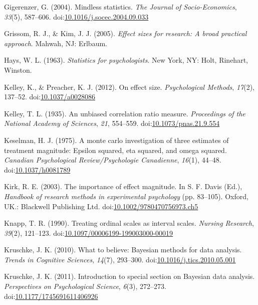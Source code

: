 \documentclass[english,man]{apa6}
\theoremstyle{definition}
\theoremstyle{definition}
\theoremstyle{definition}
\theoremstyle{remark}
\begin{document}
\hypertarget{ref-Gigerenzer2004}{}
Gigerenzer, G. (2004). Mindless statistics. \emph{The Journal of
Socio-Economics}, \emph{33}(5), 587--606.
doi:\href{https://doi.org/10.1016/j.socec.2004.09.033}{10.1016/j.socec.2004.09.033}

\hypertarget{ref-Grissom2005}{}
Grissom, R. J., \& Kim, J. J. (2005). \emph{Effect sizes for research: A
broad practical approach}. Mahwah, NJ: Erlbaum.

\hypertarget{ref-Hays1963}{}
Hays, W. L. (1963). \emph{Statistics for psychologists}. New York, NY:
Holt, Rinehart, Winston.

\hypertarget{ref-Kelley2012}{}
Kelley, K., \& Preacher, K. J. (2012). On effect size.
\emph{Psychological Methods}, \emph{17}(2), 137--52.
doi:\href{https://doi.org/10.1037/a0028086}{10.1037/a0028086}

\hypertarget{ref-Kelley1935}{}
Kelley, T. L. (1935). An unbiased correlation ratio measure.
\emph{Proceedings of the National Academy of Sciences}, \emph{21},
554--559.
doi:\href{https://doi.org/10.1073/pnas.21.9.554}{10.1073/pnas.21.9.554}

\hypertarget{ref-Keselman1975}{}
Keselman, H. J. (1975). A monte carlo investigation of three estimates
of treatment magnitude: Epsilon squared, eta squared, and omega squared.
\emph{Canadian Psychological Review/Psychologie Canadienne},
\emph{16}(1), 44--48.
doi:\href{https://doi.org/10.1037/h0081789}{10.1037/h0081789}

\hypertarget{ref-Kirk2003}{}
Kirk, R. E. (2003). The importance of effect magnitude. In S. F. Davis
(Ed.), \emph{Handbook of research methods in experimental psychology}
(pp. 83--105). Oxford, UK.: Blackwell Publishing Ltd.
doi:\href{https://doi.org/10.1002/9780470756973.ch5}{10.1002/9780470756973.ch5}

\hypertarget{ref-Knapp1990}{}
Knapp, T. R. (1990). Treating ordinal scales as interval scales.
\emph{Nursing Research}, \emph{39}(2), 121--123.
doi:\href{https://doi.org/10.1097/00006199-199003000-00019}{10.1097/00006199-199003000-00019}

\hypertarget{ref-Kruschke2010}{}
Kruschke, J. K. (2010). What to believe: Bayesian methods for data
analysis. \emph{Trends in Cognitive Sciences}, \emph{14}(7), 293--300.
doi:\href{https://doi.org/10.1016/j.tics.2010.05.001}{10.1016/j.tics.2010.05.001}

\hypertarget{ref-Kruschke2011}{}
Kruschke, J. K. (2011). Introduction to special section on Bayesian data
analysis. \emph{Perspectives on Psychological Science}, \emph{6}(3),
272--273.
doi:\href{https://doi.org/10.1177/1745691611406926}{10.1177/1745691611406926}
\end{document}
